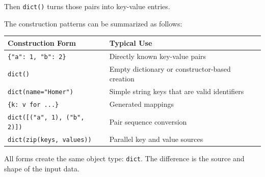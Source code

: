 Then \texttt{dict()} turns those pairs into key-value entries.

The construction patterns can be summarized as follows:

\begin{center}
\begin{tabular}{ll}
\textbf{Construction Form} & \textbf{Typical Use} \\
\hline
\texttt{\{"a": 1, "b": 2\}} & Directly known key-value pairs \\
\texttt{dict()} & Empty dictionary or constructor-based creation \\
\texttt{dict(name="Homer")} & Simple string keys that are valid identifiers \\
\texttt{\{k: v for ...\}} & Generated mappings \\
\texttt{dict([("a", 1), ("b", 2)])} & Pair sequence conversion \\
\texttt{dict(zip(keys, values))} & Parallel key and value sources \\
\end{tabular}
\end{center}

All forms create the same object type: \texttt{dict}. The difference is the source and shape of the input data.
